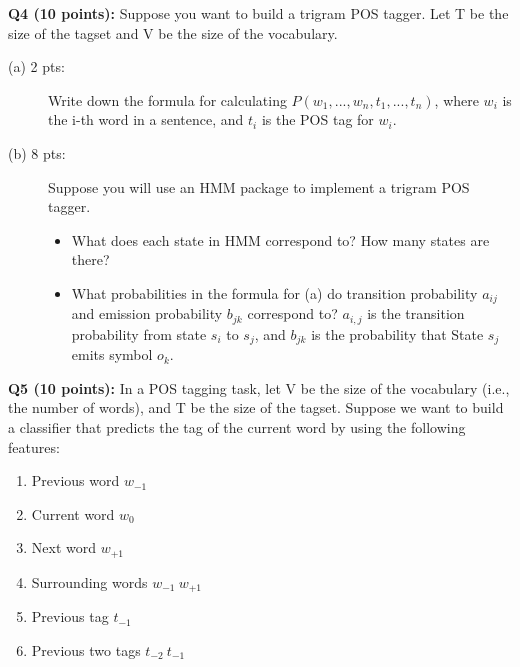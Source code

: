 \documentclass[11pt]{article}
\begin{document}
\vspace{0.3 in}
\hspace{-0.3in}
{\bf Q4 (10 points):} Suppose you want to build a trigram POS tagger.
      Let T be the size of the tagset and V be the size of the vocabulary.
  \begin{description}
   \item [(a) 2 pts:] Write down the formula for calculating 
               $P(w_1, ..., w_n, t_1, ..., t_n)$, 
               where $w_i$ is the i-th word in a sentence,
               and $t_i$ is the POS tag for $w_i$.

   \item [(b) 8 pts:] Suppose you will use an HMM package to implement
               a trigram POS tagger.
        \begin{itemize}
        \item What does each state in HMM correspond to?
              How many states are there?

         \item What probabilities in the formula for (a) do 
                transition probability $a_{ij}$
                and emission probability $b_{jk}$ correspond to? 
                $a_{i,j}$ is the transition probability from state 
                $s_i$ to $s_j$, and $b_{jk}$ is the probability that 
                State $s_j$ emits symbol $o_k$.


        \end{itemize}

   \end{description}


\vspace{0.3in}
\hspace{-0.3in}
{\bf Q5 (10 points):} In a POS tagging task, let V be the
size of the vocabulary (i.e., the number of words), and 
T be the size of the tagset.
Suppose we want to build a classifier that predicts the tag of 
  the current word by using the following features:
\begin{enumerate}
  \item Previous word $w_{-1}$
  \item Current word $w_0$
  \item Next word $w_{+1}$
  \item Surrounding words $w_{-1} \ w_{+1}$
  \item Previous tag $t_{-1}$
  \item Previous two tags $t_{-2} \ t_{-1}$
\end{enumerate}
\end{document}
